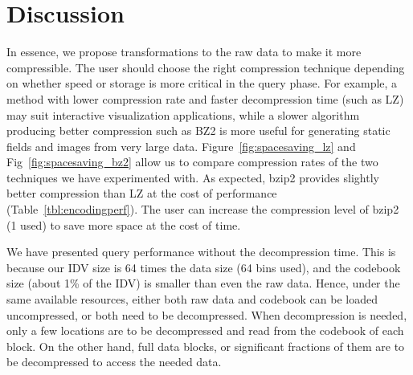 \section{Discussion}
\label{sec:discussion}
In essence, we propose transformations to the raw data to make it more compressible. The user should choose the right compression technique depending on whether speed or storage is more critical in the query phase. For example, a method with lower compression rate and faster decompression time (such as LZ) may suit interactive visualization applications, while a slower algorithm producing better compression such as BZ2 is more useful for generating static fields and images from very large data. Figure~\ref{fig:spacesaving_lz} and Fig~\ref{fig:spacesaving_bz2} allow us to compare compression rates of the two techniques we have experimented with. As expected, bzip2 provides slightly better compression than LZ at the cost of performance (Table~\ref{tbl:encodingperf}). The user can increase the compression level of bzip2 (1 used) to save more space at the cost of time.

We have presented query performance without the decompression time. This is because our IDV size is 64 times the data size (64 bins used), and the codebook size (about 1\% of the IDV) is smaller than even the raw data. Hence, under the same available resources, either both raw data and codebook can be loaded uncompressed, or both need to be decompressed. When decompression is needed, only a few locations are to be decompressed and read from the codebook of each block. On the other hand, full data blocks, or significant fractions of them are to be decompressed to access the needed data.

